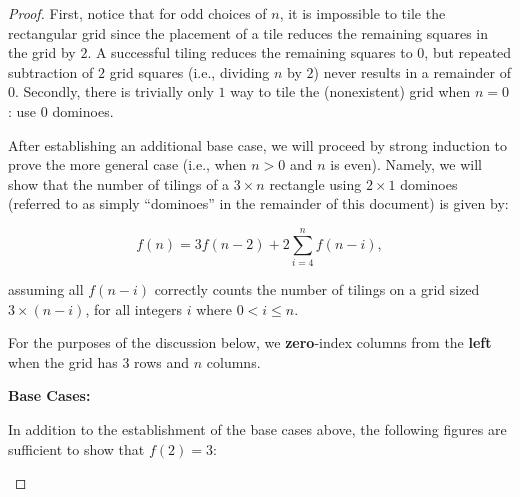 \documentclass{article}
\begin{document}
\begin{proof}

    First, notice that for odd choices of $n$, it is impossible to tile the rectangular grid since the placement of a tile reduces the remaining squares in the grid by $2$. A successful tiling reduces the remaining squares to $0$, but repeated subtraction of $2$ grid squares (i.e., dividing $n$ by $2$) never results in a remainder of $0$. Secondly, there is trivially only $1$ way to tile the (nonexistent) grid when $n = 0$: use $0$ dominoes.
    
    After establishing an additional base case, we will proceed by strong induction to prove the more general case (i.e., when $n > 0$ and $n$ is even). Namely, we will show that the number of tilings of a $3 \times n$ rectangle using $2 \times 1$ dominoes (referred to as simply ``dominoes'' in the remainder of this document) is given by:

    $$
    f(n) = 3f(n-2) + 2\sum_{i = 4}^{n}f(n-i),
    $$

    \noindent assuming all $f(n - i)$ correctly counts the number of tilings on a grid sized $3 \times (n - i)$, for all integers $i$ where $0 < i \leq n$.

    For the purposes of the discussion below, we \textbf{zero}-index columns from the \textbf{left} when the grid has $3$ rows and $n$ columns.

    \vspace{\baselineskip}
    \noindent \textbf{Base Cases:}
    \vspace{\baselineskip}
    
    In addition to the establishment of the base cases above, the following figures are sufficient to show that $f(2) = 3$:

    \begin{figure}[H]
        \centering

        \begin{minipage}[t]{0.3\textwidth}
            \centering
            \setlength{\tabcolsep}{1pt}
            \renewcommand{\arraystretch}{0.7}
            \caption{}
            \label{figure1}
        \end{minipage}
        \hfill
        

\end{figure}
\end{proof}
\end{document}
